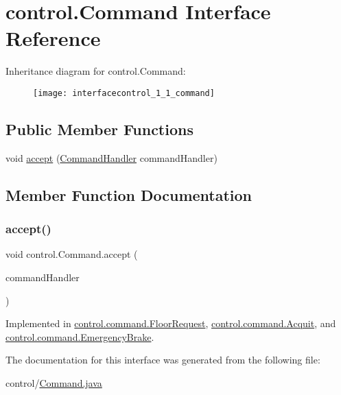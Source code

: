 \hypertarget{interfacecontrol_1_1_command}{}\section{control.\+Command Interface Reference}
\label{interfacecontrol_1_1_command}
Inheritance diagram for control.\+Command\+:\begin{figure}[H]
\begin{center}
\leavevmode
\texttt{[image: interfacecontrol\_1\_1\_command]}
\end{center}
\end{figure}
\subsection*{Public Member Functions}
\begin{DoxyCompactItemize}
\item 
void \mbox{\hyperlink{interfacecontrol_1_1_command_ab81fb31e9d98dfbfbfb7026a5bc823a6}{accept}} (\mbox{\hyperlink{interfacecontrol_1_1_command_handler}{Command\+Handler}} command\+Handler)
\end{DoxyCompactItemize}


\subsection{Member Function Documentation}
\mbox{\label{interfacecontrol_1_1_command_ab81fb31e9d98dfbfbfb7026a5bc823a6}} 
\subsubsection{\texorpdfstring{accept()}{accept()}}
{\footnotesize\ttfamily void control.\+Command.\+accept (\begin{DoxyParamCaption}\item[{\mbox{\hyperlink{interfacecontrol_1_1_command_handler}{Command\+Handler}}}]{command\+Handler }\end{DoxyParamCaption})}



Implemented in \mbox{\hyperlink{classcontrol_1_1command_1_1_floor_request_a89db76c1649b41ee844fb79898ce4de2}{control.\+command.\+Floor\+Request}}, \mbox{\hyperlink{classcontrol_1_1command_1_1_acquit_a9b0f50417f8148f36c8afed609bdd78b}{control.\+command.\+Acquit}}, and \mbox{\hyperlink{classcontrol_1_1command_1_1_emergency_brake_adabaf905354a3c45d60c76dd94efd1e3}{control.\+command.\+Emergency\+Brake}}.



The documentation for this interface was generated from the following file\+:\begin{DoxyCompactItemize}
\item 
control/\mbox{\hyperlink{_command_8java}{Command.\+java}}\end{DoxyCompactItemize}
